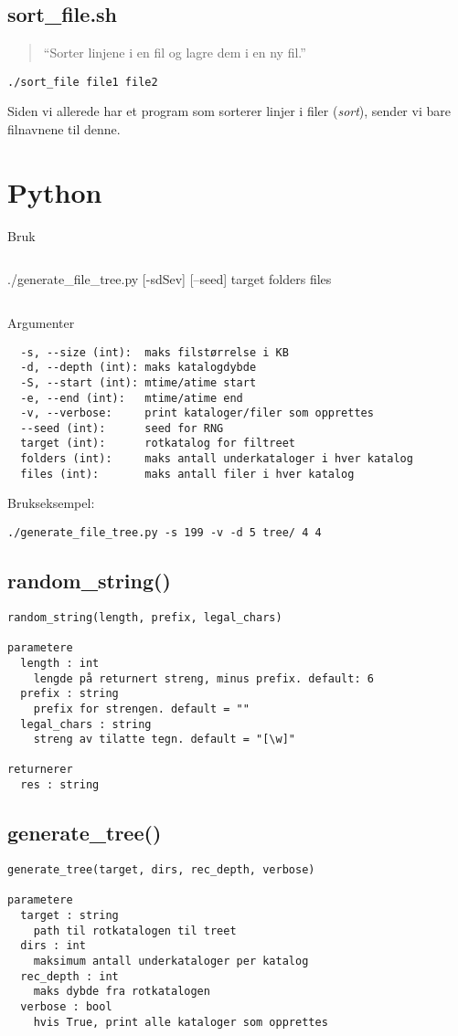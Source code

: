 \documentclass{article}
\begin{document}
\subsection{sort\_file.sh}
\label{sec:py}
\begin{quote}
``Sorter linjene i en fil og lagre dem i en ny fil.''
\end{quote}
\begin{Verbatim}
./sort_file file1 file2
\end{Verbatim}
Siden vi allerede har et program som sorterer linjer i filer (\emph{sort}), sender vi 
bare filnavnene til denne.
\section{Python}

Bruk
\begin{Verbatim}
\end{Verbatim}
  ./generate_file_tree.py [-sdSev] [--seed] target folders files
\begin{Verbatim}
\end{Verbatim}
Argumenter
\begin{Verbatim}
  -s, --size (int):  maks filstørrelse i KB
  -d, --depth (int): maks katalogdybde
  -S, --start (int): mtime/atime start
  -e, --end (int):   mtime/atime end
  -v, --verbose:     print kataloger/filer som opprettes
  --seed (int):      seed for RNG
  target (int):      rotkatalog for filtreet
  folders (int):     maks antall underkataloger i hver katalog
  files (int):       maks antall filer i hver katalog  
\end{Verbatim}
Brukseksempel:
\begin{Verbatim}
./generate_file_tree.py -s 199 -v -d 5 tree/ 4 4
\end{Verbatim}

\subsection{random\_string()}
\begin{Verbatim}
random_string(length, prefix, legal_chars)

parametere 
  length : int
    lengde på returnert streng, minus prefix. default: 6
  prefix : string
    prefix for strengen. default = ""
  legal_chars : string
    streng av tilatte tegn. default = "[\w]"

returnerer
  res : string
\end{Verbatim}

\subsection{generate\_tree()}
\begin{Verbatim}
generate_tree(target, dirs, rec_depth, verbose)

parametere 
  target : string
    path til rotkatalogen til treet
  dirs : int
    maksimum antall underkataloger per katalog
  rec_depth : int
    maks dybde fra rotkatalogen
  verbose : bool
    hvis True, print alle kataloger som opprettes
\end{Verbatim}
\end{document}
